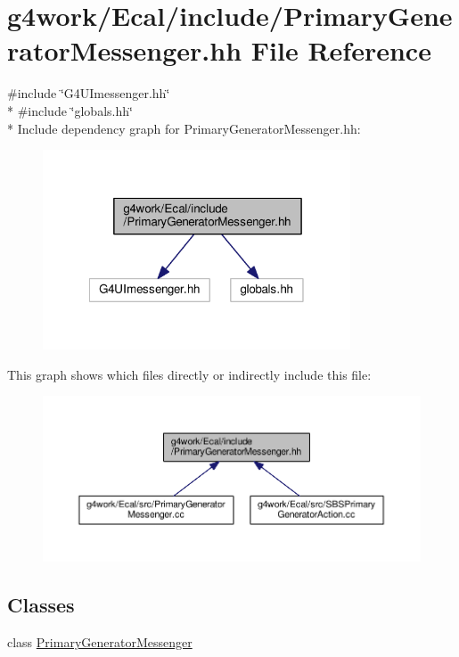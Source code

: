 \hypertarget{_primary_generator_messenger_8hh}{\section{g4work/\-Ecal/include/\-Primary\-Generator\-Messenger.hh File Reference}
\label{_primary_generator_messenger_8hh}
}
{\ttfamily \#include \char`\"{}G4\-U\-Imessenger.\-hh\char`\"{}}\\*
{\ttfamily \#include \char`\"{}globals.\-hh\char`\"{}}\\*
Include dependency graph for Primary\-Generator\-Messenger.\-hh\-:\nopagebreak
\begin{figure}[H]
\begin{center}
\leavevmode
\includegraphics[width=259pt]{_primary_generator_messenger_8hh__incl}
\end{center}
\end{figure}
This graph shows which files directly or indirectly include this file\-:\nopagebreak
\begin{figure}[H]
\begin{center}
\leavevmode
\includegraphics[width=350pt]{_primary_generator_messenger_8hh__dep__incl}
\end{center}
\end{figure}
\subsection*{Classes}
\begin{DoxyCompactItemize}
\item 
class \hyperlink{class_primary_generator_messenger}{Primary\-Generator\-Messenger}
\end{DoxyCompactItemize}
